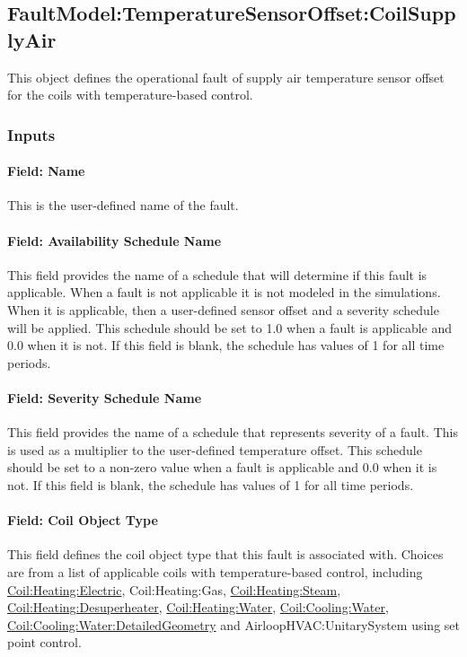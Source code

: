 \subsection{FaultModel:TemperatureSensorOffset:CoilSupplyAir}\label{faultmodeltemperaturesensoroffsetcoilsupplyair}

This object defines the operational fault of supply air temperature sensor offset for the coils with temperature-based control.

\subsubsection{Inputs}

\paragraph{Field: Name}

This is the user-defined name of the fault.

\paragraph{Field: Availability Schedule Name}

This field provides the name of a schedule that will determine if this fault is applicable. When a fault is not applicable it is not modeled in the simulations. When it is applicable, then a user-defined sensor offset and a severity schedule will be applied. This schedule should be set to 1.0 when a fault is applicable and 0.0 when it is not. If this field is blank, the schedule has values of 1 for all time periods.

\paragraph{Field: Severity Schedule Name}

This field provides the name of a schedule that represents severity of a fault. This is used as a multiplier to the user-defined temperature offset. This schedule should be set to a non-zero value when a fault is applicable and 0.0 when it is not. If this field is blank, the schedule has values of 1 for all time periods.

\paragraph{Field: Coil Object Type}

This field defines the coil object type that this fault is associated with. Choices are from a list of applicable coils with temperature-based control, including \hyperref[coilheatingelectric]{Coil:Heating:Electric}, Coil:Heating:Gas, \hyperref[coilheatingsteam]{Coil:Heating:Steam}, \hyperref[coilheatingdesuperheater]{Coil:Heating:Desuperheater}, \hyperref[coilheatingwater]{Coil:Heating:Water}, \hyperref[coilcoolingwater]{Coil:Cooling:Water}, \hyperref[coilcoolingwaterdetailedgeometry]{Coil:Cooling:Water:DetailedGeometry} and AirloopHVAC:UnitarySystem using set point control.

